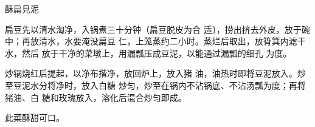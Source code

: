 \begin{recipe}{酥扁見泥}

\ingredients


\cooking

\step 扁豆先以清水淘净，入锅煮三十分钟（扁豆脱皮为合 适〕，捞出挤去外皮，放于碗中；再放清水，水要淹没扁豆 仁，上笼蒸约二小时。蒸烂后取出，放筲箕内滤干水，然后 放于干净的菜墩上，用漏瓢压成豆泥，以能通过漏瓢的细孔 为度。

\step 炒锅烧红后提起，以净布揩净，放回炉上，放入猪 油，油热时即将豆泥放入。炒至豆泥水分将净时，放入白糖 炒匀，炒至在锅内不沾锅底、不沾汤瓢为度；再将猪油、白 糖和玫瑰放入，溶化后混合炒匀即成。

\notes

此菜酥甜可口。

\end{recipe}

